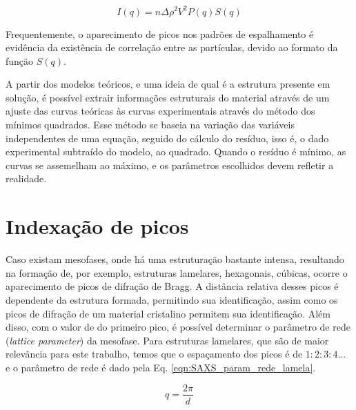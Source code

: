 		\begin{equation}
			I(q) = n\Delta \rho^2 V^2 P(q) S(q)
			\label{eqn:SAXS_I_P_S}
		\end{equation}
		
		
		Frequentemente, o aparecimento de picos nos padrões de espalhamento é evidência da existência de correlação entre as partículas, devido ao formato da função \(S(q)\).
		
		A partir dos modelos teóricos, e uma ideia de qual é a estrutura presente em solução, é possível extrair informações estruturais do material através de um ajuste das curvas teóricas às curvas experimentais através do método dos mínimos quadrados. Esse método se baseia na variação das variáveis independentes de uma equação, seguido do cálculo do resíduo, isso é, o dado experimental subtraído do modelo, ao quadrado. Quando o resíduo é mínimo, as curvas se assemelham ao máximo, e os parâmetros escolhidos devem refletir a realidade.
		
		
		\section{Indexação de picos}
		\label{sec:teoria_SAXS}
		
		Caso existam mesofases, onde há uma estruturação bastante intensa, resultando na formação de, por exemplo, estruturas lamelares, hexagonais, cúbicas, ocorre o aparecimento de picos de difração de Bragg. A distância relativa desses picos é dependente da estrutura formada, permitindo sua identificação, assim como os picos de difração de um material cristalino permitem sua identificação. Além disso, com o valor de \q{} do primeiro pico, é possível determinar o parâmetro de rede (\emph{lattice parameter}) da mesofase. Para estruturas lamelares, que são de maior relevância para este trabalho, temos que o espaçamento dos picos é de \(1:2:3:4...\) e o parâmetro de rede é dado pela Eq. \ref{eqn:SAXS_param_rede_lamela}.
		
		\begin{equation}
			q = \dfrac{2\pi}{d}
			\label{eqn:SAXS_param_rede_lamela}
		\end{equation}
		

